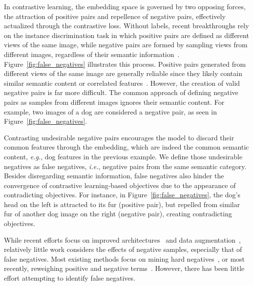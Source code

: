 \documentclass[10pt,twocolumn,letterpaper]{article}
\begin{document}
In contrastive learning, the embedding space is governed by two opposing forces, the attraction of positive pairs and repellence of negative pairs, effectively actualized through the contrastive loss. Without labels, recent breakthroughs rely on the instance discrimination task in which positive pairs are defined as different views of the same image, while negative pairs are formed by sampling views from different images, regardless of their semantic information~\cite{he2019moco, chen2020simple, misra2019selfsupervised}. Figure~\ref{fig:false_negatives} illustrates this process. Positive pairs generated from different views of the same image are generally reliable since they likely contain similar semantic content or correlated features~\cite{geirhos2020shortcut}. However, the creation of valid negative pairs is far more difficult. The common approach of defining negative pairs as samples from different images ignores their semantic content.
For example, two images of a dog are considered a negative pair, as seen in Figure~\ref{fig:false_negatives}.

Contrasting undesirable negative pairs encourages the model to discard their common features through the embedding, which are indeed the common semantic content, \emph{e.g.}, dog features in the previous example. We define those undesirable negatives as false negatives, \emph{i.e.}, negative pairs from the same semantic category. Besides disregarding semantic information, false negatives also hinder the convergence of contrastive learning-based objectives due to the appearance of contradicting objectives. For instance, in Figure~\ref{fig:false_negatives}, the dog's head on the left is attracted to its fur (positive pair), but repelled from similar fur of another dog image on the right (negative pair), creating contradicting objectives.

While recent efforts focus on improved architectures~\cite{chen2020simple, chen2020big, he2019moco} and data augmentation~\cite{chen2020simple, tian2020what}, relatively little work considers the effects of negative samples, especially that of false negatives. Most existing methods focus on mining hard negatives~\cite{robinson2020contrastive, kalantidis2020hard}, or most recently, reweighing positive and negative terms~\cite{chuang2020debiased}. However, there has been little effort attempting to identify false negatives.
\end{document}

